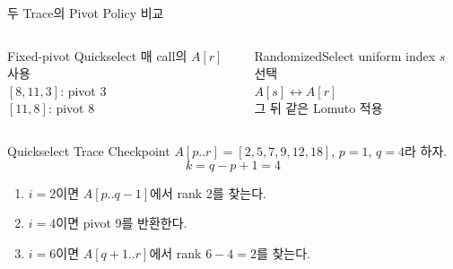 \begin{frame}{두 Trace의 Pivot Policy 비교}
\begin{columns}[T]
\begin{block}{Fixed-pivot Quickselect}
매 call의 $A[r]$ 사용\\
$[8,11,3]$: pivot 3\\
$[11,8]$: pivot 8
\end{block}
\begin{block}{RandomizedSelect}
uniform index $s$ 선택\\
$A[s]\leftrightarrow A[r]$\\
그 뒤 같은 Lomuto 적용
\end{block}
\end{columns}
\end{frame}

\begin{frame}{Quickselect Trace Checkpoint}
$A[p..r]=[2,5,7,\boxed{9},12,18]$, $p=1$, $q=4$라 하자.
\[
k=q-p+1=4
\]
\begin{enumerate}
\item $i=2$이면 $A[p..q-1]$에서 rank 2를 찾는다.
\item $i=4$이면 pivot 9를 반환한다.
\item $i=6$이면 $A[q+1..r]$에서 rank $6-4=2$를 찾는다.
\end{enumerate}
\vfill{}
\end{frame}
